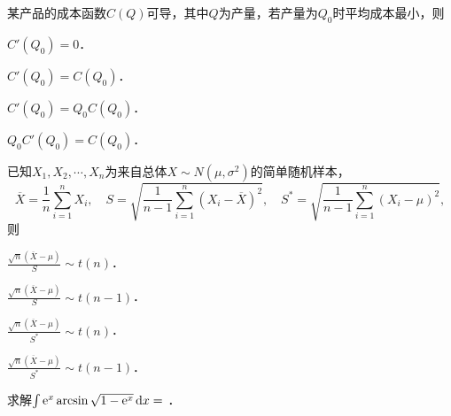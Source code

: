 \documentclass[plain,noanswer,medmath]{../../template/jnuexam}
\begin{document}












\begin{problem}
某产品的成本函数$C(Q)$可导，其中$Q$为产量，若产量为$Q_0$时平均成本最小，则\pickout{}
\begin{abcd}
\item $C'(Q_0) = 0$．
\item $C'(Q_0) = C(Q_0)$．
\item $C'(Q_0) = Q_0 C(Q_0)$．
\item $Q_0 C'(Q_0) = C(Q_0)$．
\end{abcd}
\end{problem}








\begin{problem}
已知$X_1,X_2, \cdots ,X_n$为来自总体$X \sim N\left(\mu ,\sigma^2 \right)$的简单随机样本，
$$\overline{X} = \frac{1}{n}\sum_{i = 1}^n X_i,\quad
  S = \sqrt{\frac{1}{n - 1}\sum_{i = 1}^n \left(X_i - \overline{X} \right)^2},\quad
  S^* = \sqrt{\frac{1}{n - 1}\sum_{i = 1}^n \left(X_i - \mu \right)^2},$$
则\pickout{}
\begin{abcd}
\item $\frac{\sqrt{n} \left(\overline{X} - \mu \right)}{S} \sim t(n)$．
\item $\frac{\sqrt{n} \left(\overline{X} - \mu \right)}{S} \sim t(n - 1)$．
\item $\frac{\sqrt{n} \left(\overline{X} - \mu \right)}{S^*} \sim t(n)$．
\item $\frac{\sqrt{n} \left(\overline{X} - \mu \right)}{S^*} \sim t(n - 1)$．
\end{abcd}
\end{problem}






\begin{problem}
求解$\int \mathrm{e}^x\arcsin \sqrt{1 - \mathrm{e}^x} \mathop{}\!\mathrm{d} x =$ \fillin{}．
\end{problem}
\end{document}
